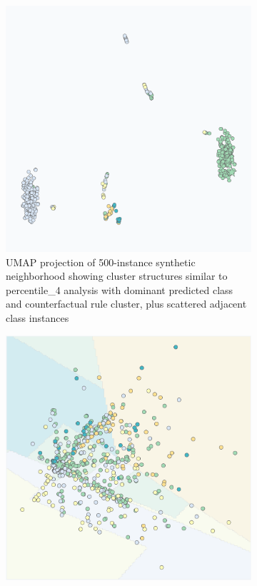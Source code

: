 \begin{figure}[ht]
\centering
\begin{subfigure}[c]{0.48\textwidth}
    \centering
    \includegraphics[width=\textwidth]{images/ds_p2_scatter_umap_500.png}
    \caption{UMAP projection of 500-instance synthetic neighborhood showing cluster structures similar to percentile\_4 analysis with dominant predicted class and counterfactual rule cluster, plus scattered adjacent class instances}
    \label{fig:ds_p2_scatter_umap_500}
\end{subfigure}
\hfill
\begin{subfigure}[c]{0.48\textwidth}
    \centering
    \includegraphics[width=\textwidth]{images/ds_p2_scatter_pca_3000.png}

\end{subfigure}
\end{figure}
